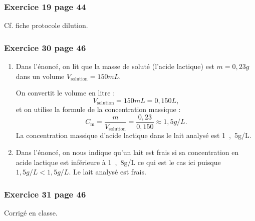 \documentclass[12pt,a4paper]{article}
\begin{document}
\subsubsection*{Exercice 19 page 44}

Cf. fiche protocole dilution.

\subsubsection*{Exercice 30 page 46}

\begin{enumerate}
\item Dans l'énoncé, on lit que la masse de soluté (l'acide lactique) est $m=\unit{0{,}23}{g}$ dans un volume $V_\mathrm{solution} = \unit{150}{mL}$.

On convertit le volume en litre :
\[ V_\mathrm{solution} = \unit{150}{mL} = \unit{0{,}150}{L}, \]
et on utilise la formule de la concentration massique :
\[ C_\mathrm{m} = \frac{m}{V_\mathrm{solution}} = \frac{0{,}23}{0{,}150} \approx \unit{1{,}5}{g/L}. \]
La concentration massique d'acide lactique dans le lait analysé est \unit{1{,}5}{g/L}.

\item Dans l'énoncé, on nous indique qu'un lait est frais si sa concentration en acide lactique est inférieure à \unit{1{,}8}{g/L} ce qui est le cas ici puisque $\unit{1{,}5}{g/L} < \unit{1{,}5}{g/L}$.
Le lait analysé est frais.
\end{enumerate}

\subsubsection*{Exercice 31 page 46}

Corrigé en classe.
\end{document}
